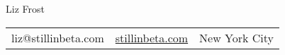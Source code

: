 \centering
\textmd{\Huge Liz Frost} \\
\begin{tabular}{c | c | c}
liz@stillinbeta.com &
\href{https://stillinbeta.com}{stillinbeta.com} &
New York City
\end{tabular}

\raggedright
